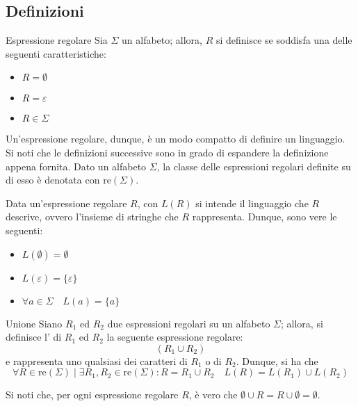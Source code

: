 \documentclass[a4paper, 12pt]{report}
\begin{document}
    \subsection{Definizioni}

    \begin{frameddefn}{Espressione regolare}
        Sia $\Sigma$ un alfabeto; allora, $R$ si definisce  se soddisfa una delle seguenti caratteristiche:

        \begin{itemize}
            \item $R = \emptyset$
            \item $R = \varepsilon$
            \item $R \in \Sigma$
        \end{itemize}

        Un'espressione regolare, dunque, è un modo compatto di definire un linguaggio. Si noti che le definizioni successive sono in grado di espandere la definizione appena fornita. Dato un alfabeto $\Sigma$, la classe delle espressioni regolari definite su di esso è denotata con $\mathrm{re}(\Sigma)$.

        Data un'espressione regolare $R$, con $L(R)$ si intende il linguaggio che $R$ descrive, ovvero l'insieme di stringhe che $R$ rappresenta. Dunque, sono vere le seguenti:

        \begin{itemize}
            \item $L(\emptyset) = \emptyset$
            \item $L(\varepsilon) = \{ \varepsilon \}$
            \item $\forall a \in \Sigma \quad L(a) = \{ a\}$
        \end{itemize}
    \end{frameddefn}

    \begin{frameddefn}{Unione}
        Siano $R_1$ ed $R_2$ due espressioni regolari su un alfabeto $\Sigma$; allora, si definisce l' di $R_1$ ed $R_2$ la seguente espressione regolare: $$(R_1 \cup R_2)$$ e rappresenta uno qualsiasi dei caratteri di $R_1$ o di $R_2$. Dunque, si ha che $$\forall R \in \mathrm{re}(\Sigma) \mid \exists R_1, R_2 \in \mathrm{re}(\Sigma) : R = R_1 \cup R_2 \quad L(R) = L(R_1) \cup L(R_2)$$

        Si noti che, per ogni espressione regolare $R$, è vero che $\emptyset \cup R = R \cup \emptyset = \emptyset$.
    \end{frameddefn}
\end{document}

